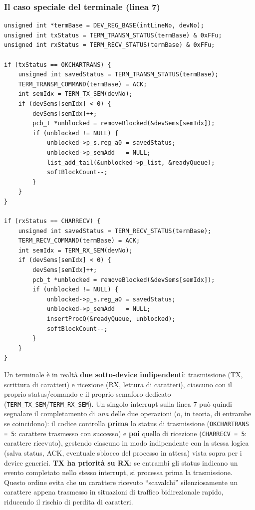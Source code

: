 \documentclass[11pt,a4paper]{article}
\newcommand{\code}[1]{\texttt{#1}}
\begin{document}
\subsubsection{Il caso speciale del terminale (linea 7)}
\begin{lstlisting}
unsigned int *termBase = DEV_REG_BASE(intLineNo, devNo);
unsigned int txStatus = TERM_TRANSM_STATUS(termBase) & 0xFFu;
unsigned int rxStatus = TERM_RECV_STATUS(termBase) & 0xFFu;

if (txStatus == OKCHARTRANS) {
    unsigned int savedStatus = TERM_TRANSM_STATUS(termBase);
    TERM_TRANSM_COMMAND(termBase) = ACK;
    int semIdx = TERM_TX_SEM(devNo);
    if (devSems[semIdx] < 0) {
        devSems[semIdx]++;
        pcb_t *unblocked = removeBlocked(&devSems[semIdx]);
        if (unblocked != NULL) {
            unblocked->p_s.reg_a0 = savedStatus;
            unblocked->p_semAdd   = NULL;
            list_add_tail(&unblocked->p_list, &readyQueue);
            softBlockCount--;
        }
    }
}

if (rxStatus == CHARRECV) {
    unsigned int savedStatus = TERM_RECV_STATUS(termBase);
    TERM_RECV_COMMAND(termBase) = ACK;
    int semIdx = TERM_RX_SEM(devNo);
    if (devSems[semIdx] < 0) {
        devSems[semIdx]++;
        pcb_t *unblocked = removeBlocked(&devSems[semIdx]);
        if (unblocked != NULL) {
            unblocked->p_s.reg_a0 = savedStatus;
            unblocked->p_semAdd   = NULL;
            insertProcQ(&readyQueue, unblocked);
            softBlockCount--;
        }
    }
}
\end{lstlisting}
Un terminale è in realtà \textbf{due sotto-device indipendenti}:
trasmissione (TX, scrittura di caratteri) e ricezione (RX, lettura di
caratteri), ciascuno con il proprio status/comando e il proprio semaforo
dedicato (\code{TERM\_TX\_SEM}/\code{TERM\_RX\_SEM}). Un singolo interrupt
sulla linea 7 può quindi segnalare il completamento di \emph{una} delle due
operazioni (o, in teoria, di entrambe se coincidono): il codice controlla
\textbf{prima} lo status di trasmissione (\code{OKCHARTRANS = 5}: carattere
trasmesso con successo) e \textbf{poi} quello di ricezione
(\code{CHARRECV = 5}: carattere ricevuto), gestendo ciascuno in modo
indipendente con la stessa logica (salva status, ACK, eventuale sblocco del
processo in attesa) vista sopra per i device generici. \textbf{TX ha
priorità su RX}: se entrambi gli status indicano un evento completato nello
stesso interrupt, si processa prima la trasmissione. Questo ordine evita
che un carattere ricevuto ``scavalchi'' silenziosamente un carattere appena
trasmesso in situazioni di traffico bidirezionale rapido, riducendo il
rischio di perdita di caratteri.
\end{document}
